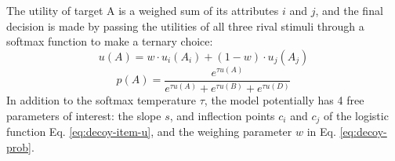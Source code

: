 \documentclass[a4paper, nobind]{templates/ociamthesis}
\begin{document}
The utility of target A is a weighed sum of its attributes \(i\) and \(j\), and the final decision is made by passing the utilities of all three rival stimuli through a softmax function to make a ternary choice:
\begin{equation}
u(A) = w \cdot u_i(A_i) + (1-w) \cdot u_j(A_j)
\label{eq:decoy-item-u}
\end{equation}
\begin{equation}
p(A) = \frac{e^{\tau u(A)}}{e^{\tau u(A)}+e^{\tau u(B)}+e^{\tau u(D)}}
\label{eq:decoy-prob}
\end{equation}
In addition to the softmax temperature \(\tau\), the model potentially has 4 free parameters of interest: the slope \(s\), and inflection points \(c_i\) and \(c_j\) of the logistic function Eq. \eqref{eq:decoy-item-u}, and the weighing parameter \(w\) in Eq. \eqref{eq:decoy-prob}.
\end{document}
